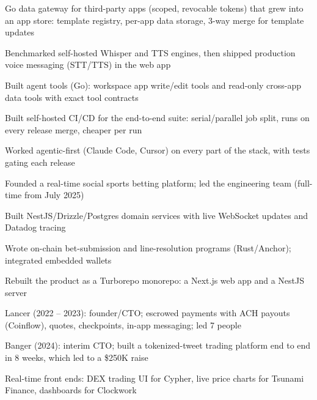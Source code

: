 \documentclass[print]{jack-resume}
\begin{document}
\begin{tightemize}
    \item Go data gateway for third-party apps (scoped, revocable tokens) that grew into an app store: template registry, per-app data storage, 3-way merge for template updates
    \item Benchmarked self-hosted Whisper and TTS engines, then shipped production voice messaging (STT/TTS) in the web app
    \item Built agent tools (Go): workspace app write/edit tools and read-only cross-app data tools with exact tool contracts
    \item Built self-hosted CI/CD for the end-to-end suite: serial/parallel job split, runs on every release merge, cheaper per run
    \item Worked agentic-first (Claude Code, Cursor) on every part of the stack, with tests gating each release
\end{tightemize}
\sectionsep

\begin{tightemize}
    \item Founded a real-time social sports betting platform; led the engineering team (full-time from July 2025)
    \item Built NestJS/Drizzle/Postgres domain services with live WebSocket updates and Datadog tracing
    \item Wrote on-chain bet-submission and line-resolution programs (Rust/Anchor); integrated embedded wallets
    \item Rebuilt the product as a Turborepo monorepo: a Next.js web app and a NestJS server
\end{tightemize}
\sectionsep

\begin{tightemize}
    \item Lancer (2022 -- 2023): founder/CTO; escrowed payments with ACH payouts (Coinflow), quotes, checkpoints, in-app messaging; led 7 people
    \item Banger (2024): interim CTO; built a tokenized-tweet trading platform end to end in 8 weeks, which led to a \$250K raise
    \item Real-time front ends: DEX trading UI for Cypher, live price charts for Tsunami Finance, dashboards for Clockwork
\end{tightemize}
\sectionsep
\end{document}
